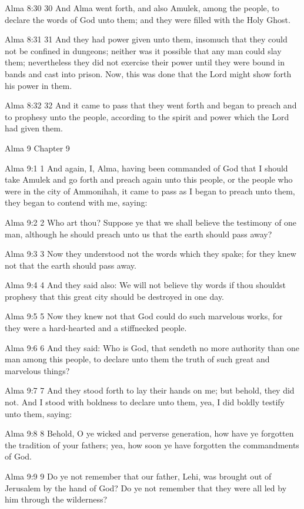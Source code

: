 Alma 8:30
 30 And Alma went forth, and also Amulek, among the people, to
declare the words of God unto them; and they were filled with the
Holy Ghost.

Alma 8:31
 31 And they had power given unto them, insomuch that they could
not be confined in dungeons; neither was it possible that any man
could slay them; nevertheless they did not exercise their power
until they were bound in bands and cast into prison. Now, this
was done that the Lord might show forth his power in them.

Alma 8:32
 32 And it came to pass that they went forth and began to preach
and to prophesy unto the people, according to the spirit and
power which the Lord had given them.

Alma 9
Chapter 9

Alma 9:1
 1 And again, I, Alma, having been commanded of God that I should
take Amulek and go forth and preach again unto this people, or
the people who were in the city of Ammonihah, it came to pass as
I began to preach unto them, they began to contend with me,
saying:

Alma 9:2
 2 Who art thou? Suppose ye that we shall believe the testimony
of one man, although he should preach unto us that the earth
should pass away?

Alma 9:3
 3 Now they understood not the words which they spake; for they
knew not that the earth should pass away.

Alma 9:4
 4 And they said also: We will not believe thy words if thou
shouldst prophesy that this great city should be destroyed in one
day.

Alma 9:5
 5 Now they knew not that God could do such marvelous works, for
they were a hard-hearted and a stiffnecked people.

Alma 9:6
 6 And they said: Who is God, that sendeth no more authority than
one man among this people, to declare unto them the truth of such
great and marvelous things?

Alma 9:7
 7 And they stood forth to lay their hands on me; but behold,
they did not. And I stood with boldness to declare unto them,
yea, I did boldly testify unto them, saying:

Alma 9:8
 8 Behold, O ye wicked and perverse generation, how have ye
forgotten the tradition of your fathers; yea, how soon ye have
forgotten the commandments of God.

Alma 9:9
 9 Do ye not remember that our father, Lehi, was brought out of
Jerusalem by the hand of God? Do ye not remember that they were
all led by him through the wilderness?

